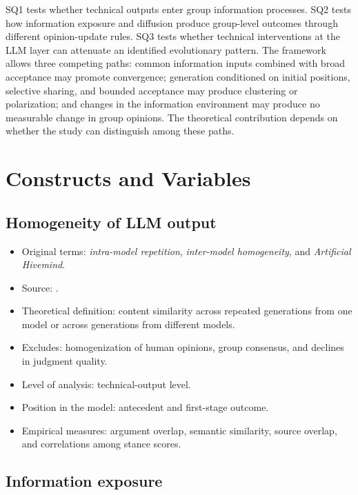 \documentclass[11pt,a4paper]{article}
\newcommand{\term}[1]{\textit{#1}}
\begin{document}
SQ1 tests whether technical outputs enter group information processes. SQ2 tests how information exposure and diffusion produce group-level outcomes through different opinion-update rules. SQ3 tests whether technical interventions at the LLM layer can attenuate an identified evolutionary pattern. The framework allows three competing paths: common information inputs combined with broad acceptance may promote convergence; generation conditioned on initial positions, selective sharing, and bounded acceptance may produce clustering or polarization; and changes in the information environment may produce no measurable change in group opinions. The theoretical contribution depends on whether the study can distinguish among these paths.

\section{Constructs and Variables}

\subsection{Homogeneity of LLM output}

\begin{itemize}
\item Original terms: \term{intra-model repetition}, \term{inter-model homogeneity}, and \term{Artificial Hivemind}.
\item Source: \citet{jiang2025}.
\item Theoretical definition: content similarity across repeated generations from one model or across generations from different models.
\item Excludes: homogenization of human opinions, group consensus, and declines in judgment quality.
\item Level of analysis: technical-output level.
\item Position in the model: antecedent and first-stage outcome.
\item Empirical measures: argument overlap, semantic similarity, source overlap, and correlations among stance scores.
\end{itemize}

\subsection{Information exposure}
\end{document}
